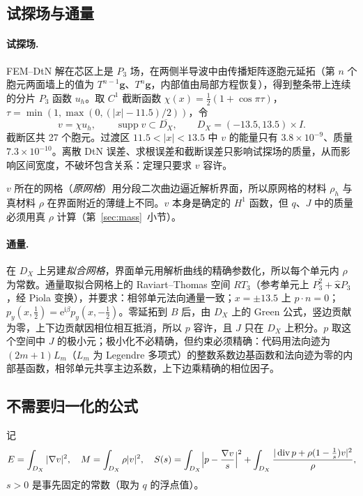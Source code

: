 \documentclass[11pt,a4paper,fontset=fandol]{ctexart}
\newcommand{\ii}{\mathrm{i}}
\newcommand{\ee}{\mathrm{e}}
\theoremstyle{plain}
\theoremstyle{definition}
\theoremstyle{remark}
\begin{document}
\subsection{试探场与通量}

\paragraph{试探场.} FEM--DtN 解在芯区上是 $P_3$ 场，在两侧半导波中由传播矩阵逐胞元延拓（第 $n$ 个胞元两面墙上的值为 $T^{n-1}\bm g$、$T^n\bm g$，内部值由局部方程恢复），得到整条带上连续的分片 $P_3$ 函数 $u_h$。取 $C^1$ 截断函数 $\chi(x)=\frac12(1+\cos\pi\tau)$，$\tau=\min(1,\max(0,(|x|-11.5)/2))$，令
\[
v=\chi u_h,\qquad\operatorname{supp}v\subset\overline{D_X},\qquad D_X=(-13.5,13.5)\times I .
\]
截断区共 27 个胞元。过渡区 $11.5<|x|<13.5$ 中 $v$ 的能量只有 $3.8\times10^{-9}$、质量 $7.3\times10^{-10}$。离散 DtN 误差、求根误差和截断误差只影响试探场的质量，从而影响区间宽度，不破坏包含关系：定理只要求 $v$ 容许。

$v$ 所在的网格（\emph{原网格}）用分段二次曲边逼近解析界面，所以原网格的材料 $\rho_h$ 与真材料 $\rho$ 在界面附近的薄缝上不同。$v$ 本身是确定的 $H^1$ 函数，但 $q$、$J$ 中的质量必须用真 $\rho$ 计算（第~\ref{sec:mass}~小节）。

\paragraph{通量.} 在 $D_X$ 上另建\emph{拟合网格}，界面单元用解析曲线的精确参数化，所以每个单元内 $\rho$ 为常数。通量取拟合网格上的 Raviart--Thomas 空间 $RT_3$（参考单元上 $P_3^2+\widehat{\bm x}P_3$，经 Piola 变换），并要求：相邻单元法向通量一致；$x=\pm13.5$ 上 $p\cdot n=0$；$p_y(x,\frac12)=\ee^{\ii\beta}p_y(x,-\frac12)$。零延拓到 $B$ 后，由 $D_X$ 上的 Green 公式，竖边贡献为零，上下边贡献因相位相互抵消，所以 $p$ 容许，且 $J$ 只在 $D_X$ 上积分。$p$ 取这个空间中 $J$ 的极小元；极小化不必精确，但约束必须精确：代码用法向迹为 $(2m+1)L_m$（$L_m$ 为 Legendre 多项式）的整数系数边基函数和法向迹为零的内部基函数，相邻单元共享主边系数，上下边乘精确的相位因子。

\subsection{不需要归一化的公式}

记
\begin{equation}
\label{eq:EMS}
E=\int_{D_X}|\nabla v|^2,\quad M=\int_{D_X}\rho|v|^2,\quad
S(s)=\int_{D_X}\Bigl|p-\frac{\nabla v}s\Bigr|^2+\int_{D_X}\frac{|\operatorname{div}p+\rho(1-\frac1s)v|^2}{\rho},
\end{equation}
$s>0$ 是事先固定的常数（取为 $q$ 的浮点值）。
\end{document}
